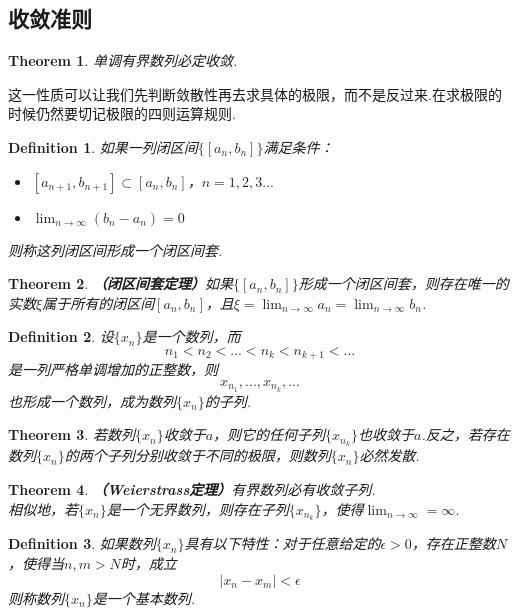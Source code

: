 \documentclass[9pt]{ctexart}
\newtheorem{definition}{Definition}[section]
\newtheorem{theorem}{Theorem}[section]
\begin{document}
\subsection{收敛准则}
\begin{theorem}
    单调有界数列必定收敛.
\end{theorem}
\par{这一性质可以让我们先判断敛散性再去求具体的极限，而不是反过来.在求极限的时候仍然要切记极限的四则运算规则.}
\begin{definition}
    如果一列闭区间$\{[a_n,b_n]\}$满足条件：
    \begin{itemize}
        \item[（1）] $[a_{n+1},b_{n+1}]\subset[a_n,b_n]$，$n=1,2,3...$
        \item[（2）] $\lim_{n\to\infty}(b_n-a_n)=0$
    \end{itemize}
    则称这列闭区间形成一个闭区间套.
\end{definition}

\begin{theorem}
    \textbf{（闭区间套定理）}如果$\{[a_n,b_n]\}$形成一个闭区间套，则存在唯一的实数$\xi$属于所有的闭区间$[a_n,b_n]$，且$\xi=\lim_{n\to\infty}a_n=\lim_{n\to\infty}b_n$.
\end{theorem}

\begin{definition}
    设$\{x_n\}$是一个数列，而
    \[n_1<n_2<...<n_k<n_{k+1}<...\]
    是一列严格单调增加的正整数，则
    \[x_{n_1},...,x_{n_k},...\]
    也形成一个数列，成为数列$\{x_n\}$的子列.
\end{definition}

\begin{theorem}
    若数列$\{x_n\}$收敛于$a$，则它的任何子列$\{x_{n_k}\}$也收敛于$a$.反之，若存在数列$\{x_n\}$的两个子列分别收敛于不同的极限，则数列$\{x_n\}$必然发散.
\end{theorem}

\begin{theorem}
   \textbf{（Weierstrass定理）}有界数列必有收敛子列.\\相似地，若$\{x_n\}$是一个无界数列，则存在子列$\{x_{n_k}\}$，使得$\lim_{n\to\infty}=\infty$.  
\end{theorem}

\begin{definition}
    如果数列$\{x_n\}$具有以下特性：对于任意给定的$\epsilon>0$，存在正整数$N$，使得当$n,m>N$时，成立
    \[|x_n-x_m|<\epsilon\]
    则称数列$\{x_n\}$是一个基本数列.
\end{definition}
\end{document}

